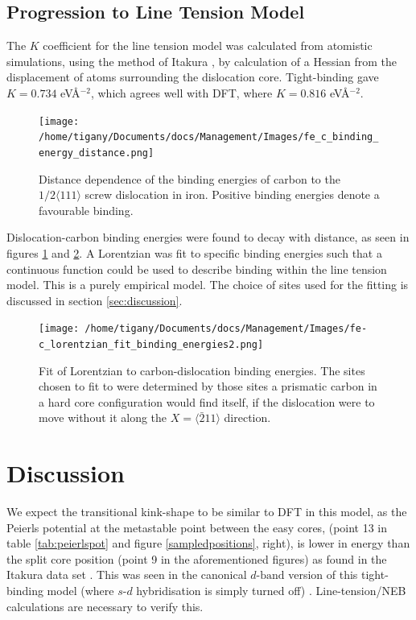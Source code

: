 \documentclass[a4paper,11pt]{article}
\begin{document}
\subsection{Progression to Line Tension Model}
\label{sec:org235982e}


The \(K\) coefficient for the line tension model was calculated from atomistic simulations, using
the method of Itakura \cite{Itakura2012}, by calculation of a Hessian from the displacement of
atoms surrounding the dislocation core. Tight-binding gave \(K = 0.734\) eV\AA{}\(^{-2}\), which agrees well
with DFT, where \(K = 0.816\) eV\AA{}\(^{-2}\).


\begin{figure}[htbp]

\texttt{[image: /home/tigany/Documents/docs/Management/Images/fe\_c\_binding\_energy\_distance.png]}
\caption{Distance dependence of the binding energies of carbon to the \(1/2\langle 111 \rangle\) screw dislocation in iron. Positive binding energies denote a favourable binding. \label{distancedep}}
\end{figure}

Dislocation-carbon binding energies were found to decay with distance, as seen in figures
\ref{distancedep} and \ref{lorentzianfit}. A Lorentzian was fit to specific binding energies such
that a continuous function could be used to describe binding within
the line tension model. This is a purely empirical model. The
choice of sites used for the fitting is discussed in section \ref{sec:discussion}.




\begin{figure}[htbp]

\texttt{[image: /home/tigany/Documents/docs/Management/Images/fe-c\_lorentzian\_fit\_binding\_energies2.png]}
\caption{Fit of Lorentzian to carbon-dislocation binding energies. The sites chosen to fit to were determined by those sites a prismatic carbon in a hard core configuration would find itself, if the dislocation were to move without it along the \(X = \langle\bar{2}11\rangle\) direction. \label{lorentzianfit}}
\end{figure}



\section{Discussion}
\label{sec:orgcc9c34a}
\label{sec:discussion}

We expect the transitional kink-shape to be similar to DFT in this model, as the Peierls
potential at the metastable point between the easy cores, (point 13 in table
\ref{tab:peierlspot} and figure \ref{sampledpositions}, right), is lower in energy than the
split core position (point 9 in the aforementioned figures) as found in the Itakura data set
\cite{Itakura2012}. This was seen in the canonical \(d\text{-band}\) version of this
tight-binding model (where \(s\text{-}d\) hybridisation is simply turned off)
\cite{Simpson2019}. Line-tension/NEB calculations are necessary to verify this.
\end{document}

